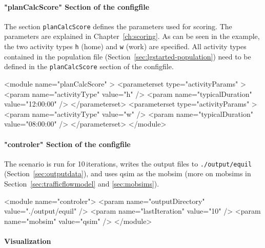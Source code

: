 
\paragraph{"planCalcScore" Section of the \protect\gls{configfile}}

The section \lstinline|planCalcScore| defines the parameters used for scoring. The parameters are explained in Chapter~\ref{ch:scoring}. As can be seen in the example, the two activity types \lstinline|h| (home) and \lstinline|w| (work) are specified.  All activity types contained in the population file (\cf Section~\ref{sec:lgstarted-population}) need to be defined in the \lstinline{planCalcScore} section of the \gls{configfile}.
\begin{xml}
<module name="planCalcScore" >
   <parameterset type="activityParams" >
      <param name="activityType" value="h" />
      <param name="typicalDuration" value="12:00:00" />
   </parameterset>
   <parameterset type="activityParams" >
      <param name="activityType" value="w" />
      <param name="typicalDuration" value="08:00:00" />
   </parameterset>
</module>
\end{xml}

\paragraph{"controler" Section of the \protect\gls{configfile}}

The scenario is run for 10\,iterations, writes the output files to \lstinline|./output/equil| (Section~\ref{sec:outputdata}), and uses \gls{qsim} as the \gls{mobsim} (more on \glspl{mobsim} in Section~\ref{sec:trafficflowmodel} and \ref{sec:mobsims}).
\begin{xml}
<module name="controler">
	<param name="outputDirectory" value="./output/equil" />
	<param name="lastIteration" value="10" />
	<param name="mobsim" value="qsim" />	
</module>
\end{xml}


\paragraph{Visualization}


